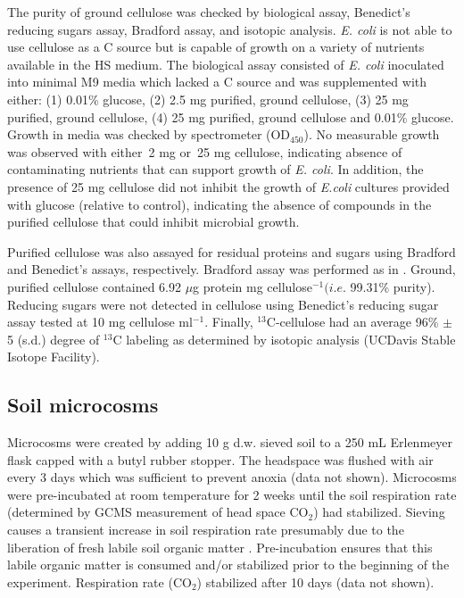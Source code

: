 \documentclass{article}
\begin{document}
The purity of ground cellulose was checked by biological assay, Benedict's
reducing sugars assay, Bradford assay, and isotopic analysis. \textit{E. coli}
is not able to use cellulose as a C source but is capable of growth on
a variety of nutrients available in the HS medium. The biological assay
consisted of \textit{E. coli} inoculated into minimal M9 media which lacked
a C source and was supplemented with either: (1) 0.01\% glucose, (2) 2.5 mg
purified, ground cellulose, (3) 25 mg purified, ground cellulose, (4) 25 mg
purified, ground cellulose and 0.01\% glucose. Growth in media was checked by
spectrometer (OD$_{450}$). No measurable growth was observed with either~2 mg
or~25 mg cellulose, indicating absence of contaminating nutrients that can
support growth of \textit{E. coli}. In addition, the presence of 25 mg
cellulose did not inhibit the growth of \textit{E.coli} cultures provided with
glucose (relative to control), indicating the absence of compounds in the
purified cellulose that could inhibit microbial growth.

Purified cellulose was also assayed for residual proteins and sugars using
Bradford and Benedict's assays, respectively. Bradford assay was performed as
in \citep{Bradford_1976}. Ground, purified cellulose contained 6.92 $\mu$g protein mg
cellulose$^{-1} (\textit{i.e.}$ 99.31\% purity). Reducing sugars were not
detected in cellulose using Benedict's reducing sugar assay
\citep{benedict1909reagent} tested at 10 mg cellulose ml$^{-1}$. Finally,
$^{13}$C-cellulose had an average 96\% $\pm$
5 (s.d.) degree of $^{13}$C labeling as determined by isotopic analysis
  (UCDavis Stable Isotope Facility).           

\subsection{Soil microcosms}
Microcosms were created by adding 10 g d.w. sieved soil to a 250 mL
Erlenmeyer flask capped with a butyl rubber stopper. The headspace was flushed
with air every 3 days which was sufficient to prevent anoxia (data not shown).
Microcosms were pre-incubated at room temperature for 2 weeks until the soil
respiration rate (determined by GCMS measurement of head space CO$_{2}$) had
stabilized. Sieving causes a transient increase in soil respiration rate
presumably due to the liberation of fresh labile soil organic matter
\citep{Datta_2014}. Pre-incubation ensures that this labile organic matter is
consumed and/or stabilized prior to the beginning of the experiment.
Respiration rate (CO$_{2}$) stabilized after 10 days (data not shown). 
\end{document}
